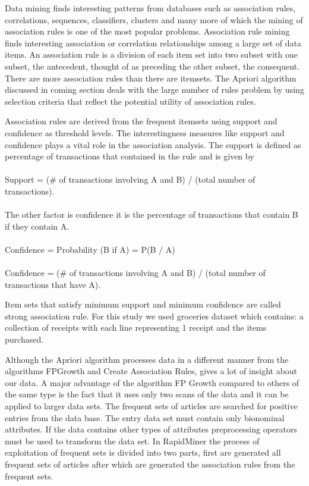 \documentclass{article}\usepackage[]{graphicx}\usepackage[]{color}
\begin{document}
\hspace{0.5cm}Data mining finds interesting patterns from databases such as association rules, correlations, sequences, classifiers, clusters and many more of which the mining of association rules is one of the most popular problems. Association rule mining finds interesting association or correlation relationships  among a large set of data items. An association rule is a division of each item set into two subset with one subset, the antecedent, thought of as preceding the other subset, the consequent. There are more association rules than there are itemsets. The Apriori algorithm discussed in coming section deals with the large number of rules problem by using selection criteria that reflect the potential utility of association rules.\par
\hspace{0.5cm}Association rules are derived from the frequent itemsets using support and confidence as threshold levels. The interestingness measures like support and confidence plays a vital role in the association analysis. The support is defined as percentage of transactions that contained in the rule and is given by\\\\
Support = ($\#$ of transactions involving A and B) / (total number of transactions).\\\\
The other factor is confidence it is the percentage of transactions that contain B if they contain A.\\\\
Confidence = Probability (B if A) = P({B / A})\\\\
Confidence = {($\#$ of transactions involving A and B) / (total number of transactions that have A)}.\par
\hspace{0.5cm}Item sets that satisfy minimum support and minimum confidence are called strong association rule. For this study we used groceries dataset which contains: a collection of receipts with each line representing 1 receipt and the items purchased.\par
\hspace{0.5cm} Although the Apriori algorithm processes data in a  different manner from the algorithms 
FPGrowth and Create Association Rules, gives a lot of insight about our data. A major advantage of  the  algorithm FP Growth compared to others of the same type is the fact that it uses only two scans of the data and it can be applied to larger data sets. The frequent sets of articles are searched for positive entries from the data base. The entry data set must contain only bionominal attributes. If the data contains other types of attributes preprocessing operators must be used to transform the data set. In RapidMiner the process of exploitation of frequent sets is divided into two parts, first are generated all frequent sets of articles after which are generated the association rules from the frequent sets. 
\end{document}
